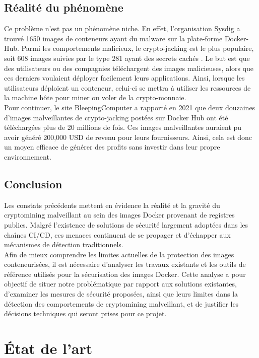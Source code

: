\subsection{Réalité du phénomène}
Ce problème n'est pas un phénomène niche. En effet, l'organisation Sysdig a trouvé 1650 images de conteneurs ayant du malware sur la plate-forme Docker-Hub. Parmi les comportements malicieux, le crypto-jacking est le plus populaire, soit 608 images suivies par le type 281 ayant des secrets cachés \cite{sysdig2026maliciousimages} \cite{bleeping2026maliciouscontainers}. Le but est que des utilisateurs ou des compagnies téléchargent des images malicieuses, alors que ces derniers voulaient déployer facilement leurs applications. Ainsi, lorsque les utilisateurs déploient un conteneur, celui-ci se mettra à utiliser les ressources de la machine hôte pour miner ou voler de la crypto-monnaie. \\
\newline
Pour continuer, le site BleepingComputer a rapporté en 2021 que deux douzaines d'images malveillantes de crypto-jacking postées sur Docker Hub ont été téléchargées plus de 20 millions de fois\cite{bleeping2026cryptominers}. Ces images malveillantes auraient pu avoir généré 200,000 USD de revenu pour leurs fournisseurs. Ainsi, cela est donc un moyen efficace de générer des profits sans investir dans leur propre environnement.
\subsection{Conclusion}
Les constats précédents mettent en évidence la réalité et la gravité du cryptomining malveillant au sein des images Docker provenant de registres publics. Malgré l'existence de solutions de sécurité largement adoptées dans les chaînes CI/CD, ces menaces continuent de se propager et d'échapper aux mécanismes de détection traditionnels. \\
\newline
Afin de mieux comprendre les limites actuelles de la protection des images conteneurisées, il est nécessaire d'analyser les travaux existants et les outils de référence utilisés pour la sécurisation des images Docker. Cette analyse a pour objectif de situer notre problématique par rapport aux solutions existantes, d'examiner les mesures de sécurité proposées, ainsi que leurs limites dans la détection des comportements de cryptomining malveillant, et de justifier les décisions techniques qui seront prises pour ce projet. \\
\section{État de l'art}
